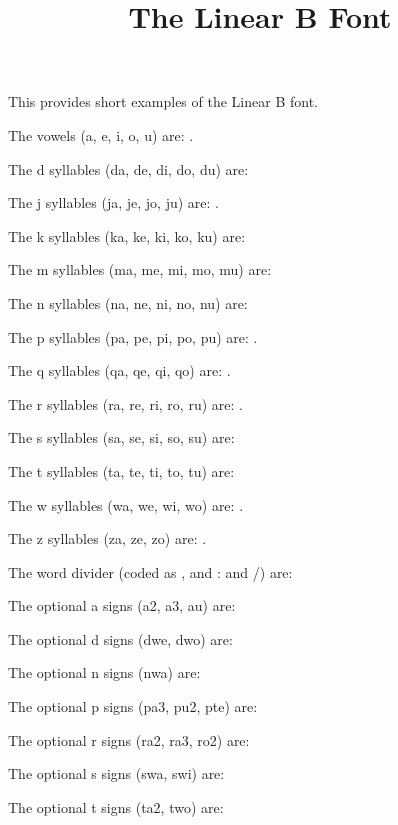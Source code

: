 \documentclass{article}
\title{The Linear B Font}
\author{}
\date{}
\begin{document}

    This provides short examples of the Linear B font.

    The vowels (a, e, i, o, u) are: .

    The d syllables (da, de, di, do, du) are: 

    The j syllables (ja, je, jo, ju) are: .

    The k syllables (ka, ke, ki, ko, ku) are: 

    The m syllables (ma, me, mi, mo, mu) are: 

    The n syllables (na, ne, ni, no, nu) are: 

    The p syllables (pa, pe, pi, po, pu) are: .

    The q syllables (qa, qe, qi, qo) are: .

    The r syllables (ra, re, ri, ro, ru) are: .

    The s syllables (sa, se, si, so, su) are: 

    The t syllables (ta, te, ti, to, tu) are: 

    The w syllables (wa, we, wi, wo) are: .

    The z syllables (za, ze, zo) are: .
  
    The word divider (coded as , and : and /) are: \textlinb{, : /}

    The optional a signs (a2, a3, au) are: \textlinb{\Baii{} \Baiii{} \Bau}

    The optional d signs (dwe, dwo) are: \textlinb{\Bdwe{} \Bdwo}

    The optional n signs (nwa) are: \textlinb{\Bnwa}

    The optional p signs (pa3, pu2, pte) are: \textlinb{\Bpaiii{} \Bpuii{} \Bpte}

    The optional r signs (ra2, ra3, ro2) are: \textlinb{\Braii{} \Braiii{} \Broii}

    The optional s signs (swa, swi) are: \textlinb{\Bswa{} \Bswi}

    The optional t signs (ta2, two) are: \textlinb{\Btaii{} \Btwo}

    
\end{document}
